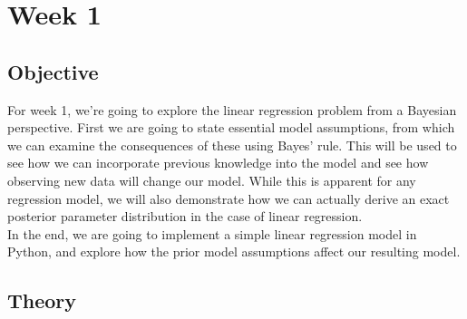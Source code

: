 \section{Week 1}
\subsection{Objective}
For week 1, we're going to explore the linear regression problem from a Bayesian perspective. 
First we are going to state essential model assumptions, from which we can examine the consequences of these using Bayes' rule.
This will be used to see how we can incorporate previous knowledge into the model and see how observing new data will change our model.
While this is apparent for any regression model, we will also demonstrate how we can actually derive an exact posterior parameter distribution in the case of linear regression.\\
In the end, we are going to implement a simple linear regression model in Python, and explore how the prior model assumptions affect our resulting model.
\subsection{Theory}

